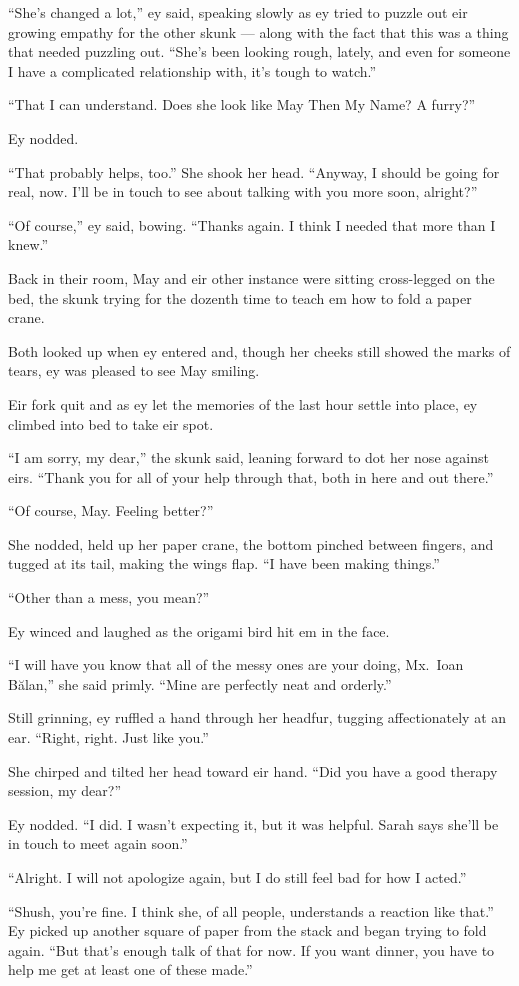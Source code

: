``She's changed a lot,'' ey said, speaking slowly as ey tried to puzzle out eir growing empathy for the other skunk --- along with the fact that this was a thing that needed puzzling out. ``She's been looking rough, lately, and even for someone I have a complicated relationship with, it's tough to watch.''

``That I can understand. Does she look like May Then My Name? A furry?''

Ey nodded.

``That probably helps, too.'' She shook her head. ``Anyway, I should be going for real, now. I'll be in touch to see about talking with you more soon, alright?''

``Of course,'' ey said, bowing. ``Thanks again. I think I needed that more than I knew.''

Back in their room, May and eir other instance were sitting cross-legged on the bed, the skunk trying for the dozenth time to teach em how to fold a paper crane.

Both looked up when ey entered and, though her cheeks still showed the marks of tears, ey was pleased to see May smiling.

Eir fork quit and as ey let the memories of the last hour settle into place, ey climbed into bed to take eir spot.

``I am sorry, my dear,'' the skunk said, leaning forward to dot her nose against eirs. ``Thank you for all of your help through that, both in here and out there.''

``Of course, May. Feeling better?''

She nodded, held up her paper crane, the bottom pinched between fingers, and tugged at its tail, making the wings flap. ``I have been making things.''

``Other than a mess, you mean?''

Ey winced and laughed as the origami bird hit em in the face.

``I will have you know that all of the messy ones are your doing, Mx.~Ioan Bălan,'' she said primly. ``Mine are perfectly neat and orderly.''

Still grinning, ey ruffled a hand through her headfur, tugging affectionately at an ear. ``Right, right. Just like you.''

She chirped and tilted her head toward eir hand. ``Did you have a good therapy session, my dear?''

Ey nodded. ``I did. I wasn't expecting it, but it was helpful. Sarah says she'll be in touch to meet again soon.''

``Alright. I will not apologize again, but I do still feel bad for how I acted.''

``Shush, you're fine. I think she, of all people, understands a reaction like that.'' Ey picked up another square of paper from the stack and began trying to fold again. ``But that's enough talk of that for now. If you want dinner, you have to help me get at least one of these made.''
